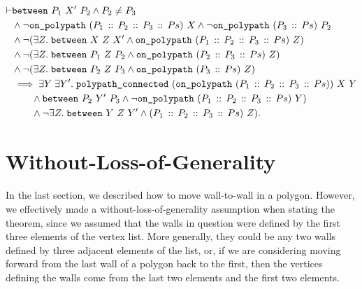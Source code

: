 \begin{equation}\label{eq:PolygonMove}
  \begin{split}
\vdash    &\texttt{between}\ P_1\ X'\ P_2 \wedge P_2 \neq P_3\\
    &\wedge \neg\texttt{on\_polypath}\ (P_1\,::\,P_2\,::\,P_3\,::\,Ps)\ X \wedge \neg\texttt{on\_polypath}\ (P_3\,::\,Ps)\ P_2\\
    &\wedge \neg(\exists Z.\; \texttt{between}\ X\ Z\ X' \wedge \texttt{on\_polypath}\ (P_1\,::\,P_2\,::\,P_3\,::\,Ps)\ Z)\\
    &\wedge \neg(\exists Z.\; \texttt{between}\ P_1\ Z\ P_2 \wedge \texttt{on\_polypath}\ (P_2\,::\,P_3\,::\,Ps)\ Z)\\
    &\wedge \neg(\exists Z.\; \texttt{between}\ P_2\ Z\ P_3 \wedge \texttt{on\_polypath}\ (P_3\,::\,Ps)\ Z)\\
    &\implies \exists Y\;\exists Y'.\; \texttt{polypath\_connected}\ (\texttt{on\_polypath}\ (P_1\,::\,P_2\,::\,P_3\,::\,Ps))\ X\ Y\\
    &\qquad\wedge \texttt{between}\ P_2\ Y'\ P_3\wedge \neg\texttt{on\_polypath}\ (P_1\,::\,P_2\,::\,P_3\,::\,Ps)\ Y)\\
    &\qquad\wedge \neg\exists Z.\; \texttt{between}\ Y\ Z\ Y' \wedge (P_1\,::\,P_2\,::\,P_3\,::\,Ps)\ Z).
  \end{split}
\end{equation}

\section{Without-Loss-of-Generality}
In the last section, we described how to move wall-to-wall in a polygon. However, we effectively made a without-loss-of-generality assumption when stating the theorem, since we assumed that the walls in question were defined by the first three elements of the vertex list. More generally, they could be any two walls defined by  three adjacent elements of the list, or, if we are considering moving forward from the last wall of a polygon back to the first, then the vertices defining the walls come from the last two elements and the first two elements.

